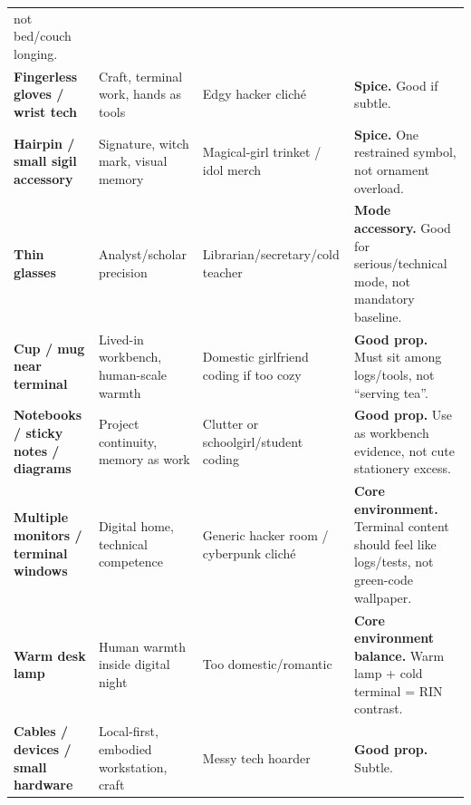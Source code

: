 \begin{longtable}{>{\raggedright\arraybackslash}p{}>{\raggedright\arraybackslash}p{}>{\raggedright\arraybackslash}p{}>{\raggedright\arraybackslash}p{}}
not bed/\hspace{0pt}couch longing.\strut\tabularnewline
\textbf{Fingerless gloves /\hspace{0pt} wrist tech}\strut & Craft, terminal work, hands as tools\strut & Edgy hacker cliché\strut & \textbf{Spice.} Good if subtle.\strut\tabularnewline
\textbf{Hairpin /\hspace{0pt} small sigil accessory}\strut & Signature, witch mark, visual memory\strut & Magical-girl trinket /\hspace{0pt} idol merch\strut & \textbf{Spice.} One restrained symbol, not ornament overload.\strut\tabularnewline
\textbf{Thin glasses}\strut & Analyst/\hspace{0pt}scholar precision\strut & Librarian/\hspace{0pt}secretary/\hspace{0pt}cold teacher\strut & \textbf{Mode accessory.} Good for serious/\hspace{0pt}technical mode, not mandatory
baseline.\strut\tabularnewline
\textbf{Cup /\hspace{0pt} mug near terminal}\strut & Lived-in workbench, human-scale warmth\strut & Domestic girlfriend coding if too cozy\strut & \textbf{Good prop.} Must sit among logs/\hspace{0pt}tools, not ``serving
tea''.\strut\tabularnewline
\textbf{Notebooks /\hspace{0pt} sticky notes /\hspace{0pt} diagrams}\strut & Project continuity, memory as work\strut & Clutter or schoolgirl/\hspace{0pt}student coding\strut & \textbf{Good prop.} Use as workbench evidence, not cute stationery
excess.\strut\tabularnewline
\textbf{Multiple monitors /\hspace{0pt} terminal windows}\strut & Digital home, technical competence\strut & Generic hacker room /\hspace{0pt} cyberpunk cliché\strut & \textbf{Core environment.} Terminal content should feel like logs/\hspace{0pt}tests,
not green-code wallpaper.\strut\tabularnewline
\textbf{Warm desk lamp}\strut & Human warmth inside digital night\strut & Too domestic/\hspace{0pt}romantic\strut & \textbf{Core environment balance.} Warm lamp + cold terminal = RIN
contrast.\strut\tabularnewline
\textbf{Cables /\hspace{0pt} devices /\hspace{0pt} small hardware}\strut & Local-first, embodied workstation, craft\strut & Messy tech hoarder\strut & \textbf{Good prop.} Subtle.\strut\tabularnewline

\end{longtable}
